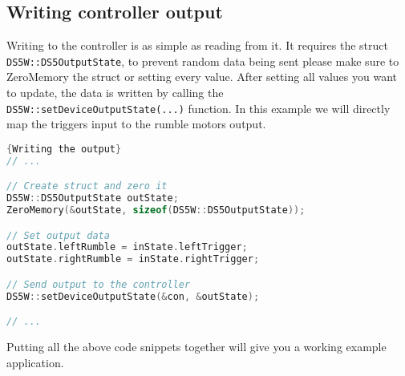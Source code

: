 \subsection{Writing controller output}
Writing to the controller is as simple as reading from it. It requires the struct \texttt{DS5W::DS5OutputState}, to prevent random data being sent please make sure to ZeroMemory the struct or setting every value. After setting all values you want to update, the data is written by calling the\\
\texttt{DS5W::setDeviceOutputState(...)} function. In this example we will directly map the triggers input to the rumble motors output.

\begin{minipage}{\textwidth}
\begin{lstlisting}[language=C++,label=code4,caption={Writing the output}]{Writing the output}
// ...

// Create struct and zero it
DS5W::DS5OutputState outState;
ZeroMemory(&outState, sizeof(DS5W::DS5OutputState));

// Set output data
outState.leftRumble = inState.leftTrigger;
outState.rightRumble = inState.rightTrigger;

// Send output to the controller
DS5W::setDeviceOutputState(&con, &outState);

// ...
\end{lstlisting}
\end{minipage}
Putting all the above code snippets together will give you a working example application.

\newpage